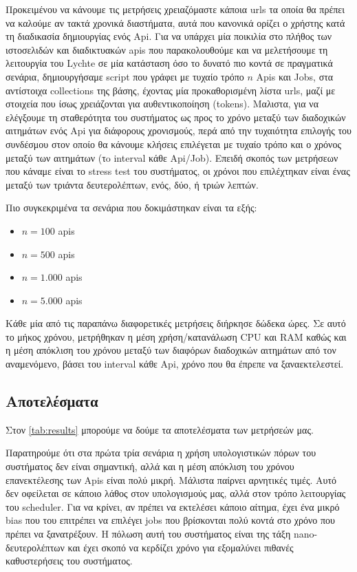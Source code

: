 Προκειμένου να κάνουμε τις μετρήσεις χρειαζόμαστε κάποια urls τα οποία θα πρέπει να καλούμε αν τακτά χρονικά διαστήματα, αυτά που κανονικά ορίζει ο χρήστης
κατά τη διαδικασία δημιουργίας ενός Api. Για να υπάρχει μία ποικιλία στο πλήθος των ιστοσελιδών και διαδικτυακών apis που παρακολουθούμε και να μελετήσουμε τη λειτουργία του Lychte σε
μία κατάσταση όσο το δυνατό πιο κοντά σε πραγματικά σενάρια, δημιουργήσαμε script που γράφει με τυχαίο τρόπο $n$ Apis και Jobs, στα αντίστοιχα collections της βάσης, έχοντας μία προκαθορισμένη
λίστα urls, μαζί με στοιχεία που ίσως χρειάζονται για αυθεντικοποίηση (tokens). Μαλιστα, για να ελέγξουμε τη σταθερότητα του συστήματος ως προς
το χρόνο μεταξύ των διαδοχικών αιτημάτων ενός Api για διάφορους χρονισμούς, περά από την τυχαιότητα επιλογής του συνδέσμου στον οποίο θα κάνουμε κλήσεις
επιλέγεται με τυχαίο τρόπο και ο χρόνος μεταξύ των αιτημάτων (τo interval κάθε Αpi/Job). Επειδή σκοπός των μετρήσεων που κάναμε είναι
το stress test του συστήματος, οι χρόνοι που επιλέχτηκαν είναι ένας μεταξύ των τριάντα δευτερολέπτων, ενός, δύο, ή τριών λεπτών.

Πιο συγκεκριμένα τα σενάρια που δοκιμάστηκαν είναι τα εξής:
\begin{itemize}
	\item $n = 100$ apis
	\item $n = 500$ apis
	\item $n = 1.000$ apis
	\item $n = 5.000$ apis
\end{itemize}

Κάθε μία από τις παραπάνω διαφορετικές μετρήσεις διήρκησε δώδεκα ώρες. Σε αυτό το μήκος χρόνου, 
μετρήθηκαν η μέση χρήση/κατανάλωση CPU και RAM καθώς και η μέση απόκλιση του χρόνου μεταξύ των διαφόρων διαδοχικών αιτημάτων
από τον αναμενόμενο, βάσει του interval κάθε Αpi, χρόνο που θα έπρεπε να ξαναεκτελεστεί. 

\subsection{Αποτελέσματα}
\label{subsection:experiment_results}

Στον \autoref{tab:results} μπορούμε να δούμε τα αποτελέσματα των μετρήσεών μας.

Παρατηρούμε ότι στα πρώτα τρία σενάρια η χρήση υπολογιστικών πόρων του συστήματος δεν είναι σημαντική, αλλά
και η μέση απόκλιση του χρόνου επανεκτέλεσης των Apis είναι πολύ μικρή. Μάλιστα παίρνει αρνητικές τιμές. Αυτό δεν οφείλεται σε κάποιο
λάθος στον υπολογισμούς μας, αλλά στον τρόπο λειτουργίας του scheduler. Για να κρίνει, αν πρέπει να εκτελέσει κάποιο αίτημα, έχει ένα μικρό bias
που του επιτρέπει να επιλέγει jobs που βρίσκονται πολύ κοντά στο χρόνο που πρέπει να ξανατρέξουν. H πόλωση αυτή του συστήματος είναι της τάξη
nano-δευτερολέπτων και έχει σκοπό να κερδίζει χρόνο για εξομαλύνει πιθανές καθυστερήσεις του συστήματος.  

